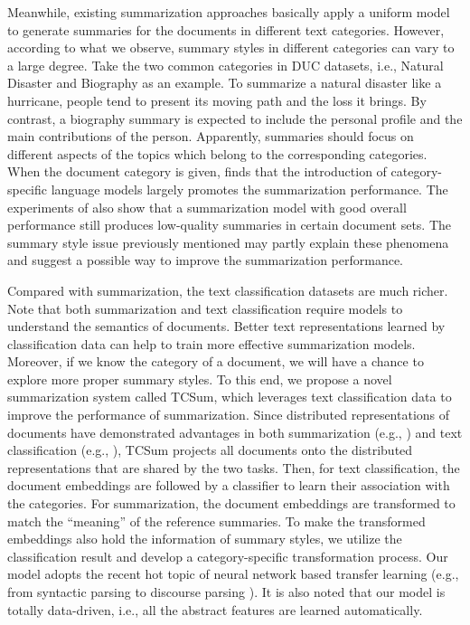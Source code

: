 \documentclass[letterpaper]{article}
\begin{document}
Meanwhile, existing summarization approaches basically apply a uniform model to generate summaries for the documents in different text categories.
However, according to what we observe, summary styles in different categories can vary to a large degree.
Take the two common categories in DUC datasets, i.e., Natural Disaster and Biography as an example.
To summarize a natural disaster like a hurricane, people tend to present its moving path and the loss it brings.
By contrast, a biography summary is expected to include the personal profile and the main contributions of the person.
Apparently, summaries should focus on different aspects of the topics which belong to the corresponding categories.
When the document category is given, \cite{kedzie-mckeown-diaz:2015:ACL-IJCNLP}
 finds that the introduction of category-specific language models largely promotes the summarization performance.
The experiments of \cite{wan2015multi} also show that a summarization model with good overall performance still produces low-quality summaries in certain document sets.
The summary style issue previously mentioned may partly explain these phenomena and suggest a possible way to improve the summarization performance.

Compared with summarization, the text classification datasets are much richer.
Note that both summarization and text classification require models to understand the semantics of documents.
Better text representations learned by classification data can help to train more effective summarization models.
Moreover, if we know the category of a document, we will have a chance to explore more proper summary styles.
To this end, we propose a novel summarization system called TCSum, which leverages text classification data to improve the performance of summarization.
Since distributed representations of documents have demonstrated advantages in both summarization (e.g., \cite{kobayashi-noguchi-yatsuka:2015:EMNLP}) and text classification (e.g., \cite{lai2015recurrent}), TCSum projects all documents onto the distributed representations that are shared by the two tasks.
Then, for text classification, the document embeddings are followed by a classifier to learn their association with the categories.
For summarization, the document embeddings are transformed to match the ``meaning'' of the reference summaries.
To make the transformed embeddings also hold the information of summary styles, we utilize the classification result and develop a category-specific transformation process.
Our model adopts the recent hot topic of neural network based transfer learning (e.g., from syntactic parsing to discourse parsing \cite{li2014recursive}).
It is also noted that our model is totally data-driven, i.e., all the abstract features are learned automatically.
\end{document}
